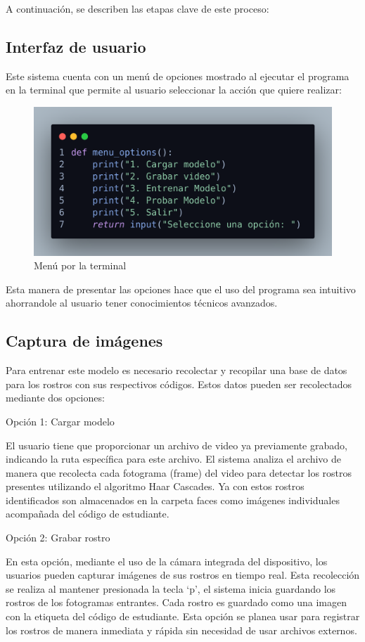 \documentclass[12pt]{article}
\begin{document}
{A continuación, se describen las etapas clave de este proceso:
\subsection{Interfaz de usuario}
Este sistema cuenta con un menú de opciones mostrado al ejecutar el programa en la terminal que permite al usuario seleccionar la acción que quiere realizar:

\begin{figure}[h]
    \centering
    \includegraphics[width=0.8\linewidth]{imagenes/code.png}
    \caption{Menú por la terminal}
    \label{fig:enter-label}
\end{figure}

Esta manera de presentar las opciones hace que el uso del programa sea intuitivo ahorrandole al usuario tener conocimientos técnicos avanzados.

\subsection{Captura de imágenes}
Para entrenar este modelo es necesario recolectar y recopilar una base de datos para los rostros con sus respectivos códigos. Estos datos pueden ser recolectados mediante dos opciones:
\begin{itemize}
	{\bfseries\item Opción 1: Cargar modelo \par}
    {\normalsize El usuario tiene que proporcionar un archivo de video ya previamente grabado, indicando la ruta específica para este archivo. El sistema analiza el archivo de manera que recolecta cada fotograma (frame) del video para detectar los rostros presentes utilizando el algoritmo Haar Cascades. Ya con estos rostros identificados son almacenados en la carpeta faces como imágenes individuales acompañada del código de estudiante.}

    {\bfseries\item Opción 2: Grabar rostro\par}
    {\normalsize En esta opción, mediante el uso de la cámara integrada del dispositivo, los usuarios pueden capturar imágenes de sus rostros en tiempo real. Esta recolección se realiza al mantener presionada la tecla ‘p’, el sistema inicia guardando los rostros de los fotogramas entrantes. Cada rostro es guardado como una imagen con la etiqueta del código de estudiante. Esta opción se planea usar para registrar los rostros de manera inmediata y rápida sin necesidad de usar archivos externos.}
	

\end{itemize}}
\end{document}
